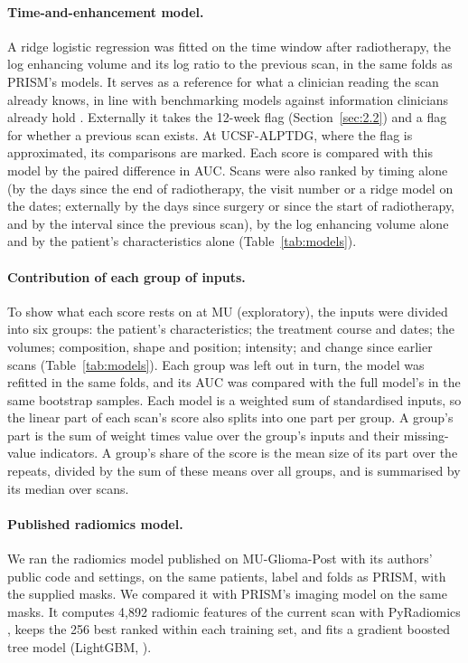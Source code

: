 \documentclass[largeformat]{interact} %
\begin{document}
\paragraph*{Time-and-enhancement model.} A ridge logistic regression was fitted on the time window after radiotherapy,
the log enhancing volume and its log ratio to the previous scan, in the same folds as PRISM's models. It serves as a
reference for what a clinician reading the scan already knows, in line with benchmarking models against information
clinicians already hold \citep{beaulieujones2021}. Externally it takes the
12-week flag (Section~\ref{sec:2.2}) and a flag for whether a previous scan exists. At UCSF-ALPTDG, where the flag is approximated, its comparisons are marked. Each score is compared with this model by the paired
difference in AUC. Scans were also ranked by timing alone (by the days since the end of radiotherapy, the visit number or a ridge model
on the dates; externally by the days since surgery or since the start of radiotherapy, and by the interval since the
previous scan), by the log enhancing volume alone and by the patient's characteristics alone (Table~\ref{tab:models}).

\paragraph*{Contribution of each group of inputs.} To show what each score rests on at MU (exploratory), the inputs were divided into
six groups: the patient's characteristics; the treatment course and dates; the volumes; composition, shape and
position; intensity; and change since earlier scans (Table~\ref{tab:models}). Each group
was left out in turn, the model was refitted in the same folds, and its AUC was compared with the full model's in the
same bootstrap samples. Each model is a weighted sum of standardised inputs, so the linear part of each scan's score
also splits into one part per group. A group's part is the sum of weight times value over the group's inputs and their
missing-value indicators. A group's share of the score is the mean size of its part over the repeats, divided by the sum of these means
over all groups, and is summarised by its median over scans.


\paragraph*{Published radiomics model.} We ran the radiomics model published on MU-Glioma-Post
\citep{christodoulou2026} with its authors' public code \citep{christodoulou2026code} and settings, on the same patients, label and folds as
PRISM, with the supplied masks. We compared it with PRISM's imaging model on the same masks. It computes 4,892 radiomic features of the current scan
with PyRadiomics \citep{vangriethuysen2017}, keeps the 256 best ranked within each training set, and fits a gradient
boosted tree model (LightGBM, \citealp{ke2017}).
\end{document}
